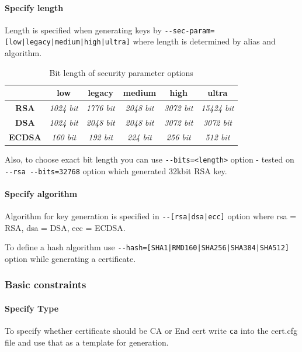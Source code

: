 \documentclass[10pt, a4paper]{report}
\begin{document}
\pagebreak

      \paragraph{Specify length}

Length is specified when generating keys by \verb+--sec-param=[low|legacy|medium|high|ultra]+ where length is determined by alias and algorithm.

\begin{table}[]
\centering
\caption{Bit length of security parameter options}
\label{my-label}
\begin{tabular}{|c|c|c|c|c|c|}
\hline
               & \textbf{low}      & \textbf{legacy}   & \textbf{medium}   & \textbf{high}     & \textbf{ultra}     \\ \hline
\textbf{RSA}   & \textit{1024 bit} & \textit{1776 bit} & \textit{2048 bit} & \textit{3072 bit} & \textit{15424 bit} \\ \hline
\textbf{DSA}   & \textit{1024 bit} & \textit{2048 bit} & \textit{2048 bit} & \textit{3072 bit} & \textit{3072 bit}  \\ \hline
\textbf{ECDSA} & \textit{160 bit}  & \textit{192 bit}  & \textit{224 bit}  & \textit{256 bit}  & \textit{512 bit}   \\ \hline
\end{tabular}
\end{table}

Also, to choose exact bit length you can use \verb+--bits=<length>+ option - tested on \verb+--rsa --bits=32768+ option which generated 32kbit RSA key.

      \paragraph{Specify algorithm}
Algorithm for key generation is specified in \verb+--[rsa|dsa|ecc]+ option where rsa = RSA, dsa = DSA, ecc = ECDSA.

To define a hash algorithm use \verb+--hash=[SHA1|RMD160|SHA256|SHA384|SHA512]+ option while generating a certificate.
    
  \subsubsection{Basic constraints}
    
      \paragraph{Specify Type}
To specify whether certificate should be CA or End cert write \verb+ca+ into the cert.cfg file and use that as a template for generation. 
\end{document}
